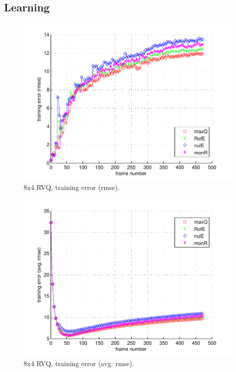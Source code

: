 \subsection{Learning}

								\begin{figure}[h!]
								\centering
								\includegraphics[height=0.4\textheight]{thesis/5_fish_8_4_1000_trg_rmse.pdf}
								\caption{8x4 RVQ, training error (rmse).}
								\label{fig:5_fish_8_4_1000_trg_rmse}
								\end{figure}


								\begin{figure}[h!]
								\centering
								\includegraphics[height=0.4\textheight]{thesis/5_fish_8_4_1000_trg_armse.pdf}
								\caption{8x4 RVQ, training error (avg. rmse).}
								\label{fig:5_fish_8_4_1000_trg_armse}
								\end{figure}

